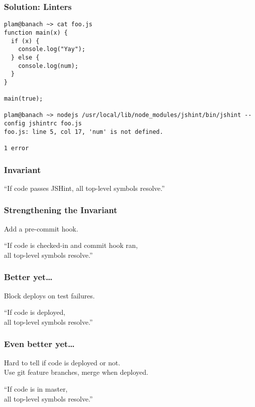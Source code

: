 \documentclass{beamer}
\newenvironment{changemargin}[1]{%
  \begin{list}{}{%
    \setlength{\topsep}{0pt}%
    \setlength{\leftmargin}{#1}%
    \setlength{\rightmargin}{1em}
    \setlength{\listparindent}{\parindent}%
    \setlength{\itemindent}{\parindent}%
    \setlength{\parsep}{\parskip}%
  }%
  \item[]}{\end{list}}
\begin{document}
\begin{frame}[fragile]
\frametitle{Solution: Linters}
\begin{changemargin}{0cm}

\begin{lstlisting}
plam@banach ~> cat foo.js
function main(x) {
  if (x) {
    console.log("Yay");
  } else {
    console.log(num);
  }
}

main(true);

plam@banach ~> nodejs /usr/local/lib/node_modules/jshint/bin/jshint --config jshintrc foo.js
foo.js: line 5, col 17, 'num' is not defined.

1 error
\end{lstlisting}
\end{changemargin}
\end{frame}

\begin{frame}
\frametitle{Invariant}

\begin{center}
``If code passes JSHint, all top-level symbols resolve.''
\end{center}
\end{frame}

\begin{frame}
\frametitle{Strengthening the Invariant}

\begin{changemargin}{2cm}
Add a pre-commit hook.
\end{changemargin}

\begin{center}
``If code is checked-in and commit hook ran,\\ all top-level symbols resolve.''
\end{center}
\end{frame}

\begin{frame}
\frametitle{Better yet\ldots}

\begin{changemargin}{2cm}
Block deploys on test failures.
\end{changemargin}

\begin{center}
``If code is deployed,\\ all top-level symbols resolve.''
\end{center}
\end{frame}

\begin{frame}
\frametitle{Even better yet\ldots}

\begin{changemargin}{2cm}
Hard to tell if code is deployed or not.\\
Use git feature branches, merge when deployed.
\end{changemargin}
\begin{center}
``If code is in master,\\ all top-level symbols resolve.''
\end{center}
\end{frame}
\end{document}
